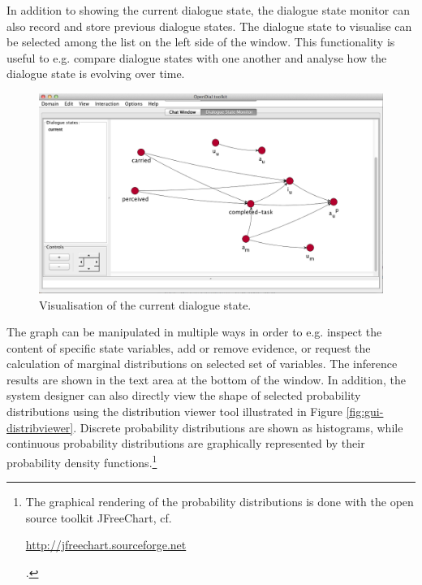 In addition to showing the current dialogue state, the dialogue state monitor can also record and store previous dialogue states.  The dialogue state to visualise can be selected among the list on the left side of the window. This functionality is useful to e.g. compare dialogue states with one another and analyse how the dialogue state is evolving over time. 

\begin{figure}[h] 
\begin{center}
\includegraphics[scale=0.40]{imgs/gui-bn.png}
\end{center} 
\caption{Visualisation of the current dialogue state.}
\label{fig:gui-bn}
\end{figure}

The graph can be manipulated in multiple ways in order to e.g. inspect the content of specific state variables, add or remove evidence, or request the calculation of marginal distributions on selected set of variables.  The inference results are shown in the text area at the bottom of the window.  In addition, the system designer can also directly view the shape of selected probability distributions using the distribution viewer tool illustrated in Figure \ref{fig:gui-distribviewer}. Discrete probability distributions are shown as histograms, while continuous probability distributions are graphically represented by their probability density functions.\footnote{The graphical rendering of the probability distributions is done with the open source toolkit JFreeChart, cf. \begin{scriptsize}\url{http://jfreechart.sourceforge.net}\end{scriptsize}.} 


